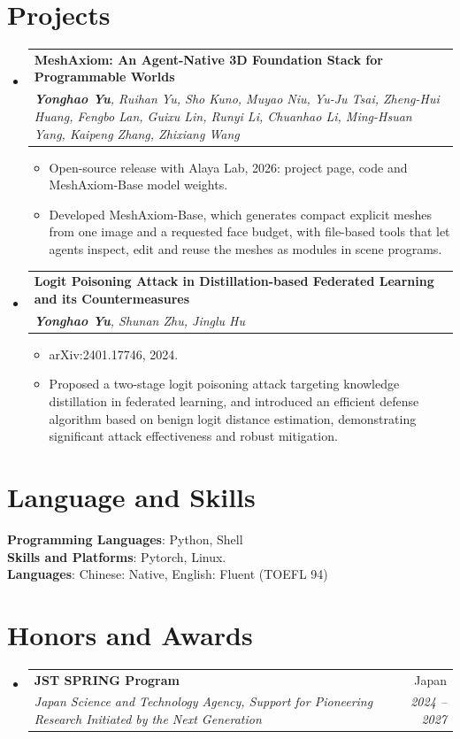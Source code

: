 \documentclass[letterpaper,11pt]{article}
\makeatletter
\newcommand{\resumeItem}[1]{
  \item\small{
    {#1 \vspace{-2pt}}
  }
}
\newcommand{\resumeSubheading}[4]{
  \vspace{-2pt}\item
    \begin{tabular*}{0.97\textwidth}[t]{l@{\extracolsep{\fill}}r}
      \textbf{#1} & #2 \\
      \textit{\small#3} & \textit{\small #4} \\
    \end{tabular*}\vspace{-7pt}
}
\newcommand{\resumePaper}[2]{
    \item
    \begin{tabular*}{0.97\textwidth}{>{\raggedright\arraybackslash}p{0.97\textwidth}}
      \textbf{#1} \\
      \textit{\small #2} \\
    \end{tabular*}\vspace{-7pt}
}
\newcommand{\resumeSubHeadingListStart}{\begin{itemize}[leftmargin=0.15in, label={}]}
\newcommand{\resumeSubHeadingListEnd}{\end{itemize}}
\newcommand{\resumeItemListStart}{\begin{itemize}}
\newcommand{\resumeItemListEnd}{\end{itemize}\vspace{-5pt}}
\makeatother
\begin{document}
\section{Projects}
  \resumeSubHeadingListStart
    \resumePaper
      {MeshAxiom: An Agent-Native 3D Foundation Stack for Programmable Worlds}
      {\textbf{Yonghao Yu}, Ruihan Yu, Sho Kuno, Muyao Niu, Yu-Ju Tsai, Zheng-Hui Huang, Fengbo Lan, Guixu Lin, Runyi Li, Chuanhao Li, Ming-Hsuan Yang, Kaipeng Zhang, Zhixiang Wang}
      \resumeItemListStart
        \resumeItem{Open-source release with Alaya Lab, 2026: project page, code and MeshAxiom-Base model weights.}
        \resumeItem{Developed MeshAxiom-Base, which generates compact explicit meshes from one image and a requested face budget, with file-based tools that let agents inspect, edit and reuse the meshes as modules in scene programs.}
      \resumeItemListEnd
    \resumePaper
      {Logit Poisoning Attack in Distillation-based Federated Learning and its Countermeasures}
      {\textbf{Yonghao Yu}, Shunan Zhu, Jinglu Hu}
      \resumeItemListStart
        \resumeItem{arXiv:2401.17746, 2024.}
        \resumeItem{Proposed a two-stage logit poisoning attack targeting knowledge distillation in federated learning, and introduced an efficient defense algorithm based on benign logit distance estimation, demonstrating significant attack effectiveness and robust mitigation.}
      \resumeItemListEnd
  \resumeSubHeadingListEnd

\section{Language and Skills}
 \begin{itemize}[leftmargin=0.15in, label={}]
    \small{\item{
     \textbf{Programming Languages}{: Python, Shell} \\
     \textbf{Skills and Platforms}{: Pytorch, Linux.} \\
     \textbf{Languages}{: Chinese: Native, English: Fluent (TOEFL 94)}
    }}
 \end{itemize}

\section{Honors and Awards}
  \resumeSubHeadingListStart
    \resumeSubheading
      {JST SPRING Program}{Japan}
      {Japan Science and Technology Agency, Support for Pioneering Research Initiated by the Next Generation}{2024 -- 2027}
  \resumeSubHeadingListEnd
\end{document}
